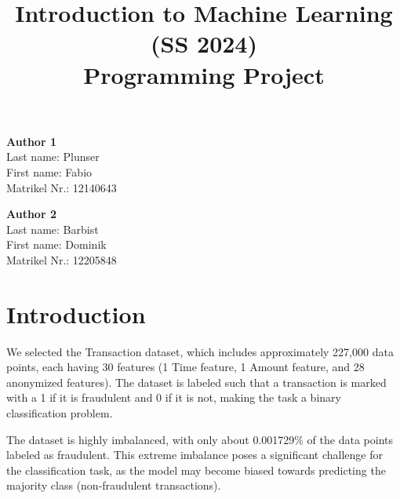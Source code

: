 \documentclass[a4, 10 pt, conference]{ieeeconf}  %
\title{\LARGE \bf
Introduction to Machine Learning (SS 2024)\\ Programming Project
\vspace{-3em}
}
\begin{document}
\maketitle
\vspace{-3em}
\thispagestyle{empty}
\pagestyle{empty}

\begin{strip}
  \begin{tcolorbox}[
      size=tight,
      colback=white,
      boxrule=0.2mm,
      left=3mm,right=3mm, top=3mm, bottom=1mm
    ]
    {\begin{multicols}{2}%

        \textbf{Author 1}       \\
        Last name: Plunser              \\  %
        First name: Fabio             \\  %
        Matrikel Nr.: 12140643               \\  %

        \columnbreak

        \textbf{Author 2}       \\
        Last name: Barbist              \\  %
        First name: Dominik             \\  %
        Matrikel Nr.: 12205848               \\  %

        \columnbreak

      \end{multicols}}
  \end{tcolorbox}
\end{strip}


\section{Introduction}
\label{sec:intro}
We selected the Transaction dataset, which includes approximately 227,000 data points, each having 30 features (1 Time feature, 1 Amount feature, and 28 anonymized features). The dataset is labeled such that a transaction is
marked with a 1 if it is fraudulent and 0 if it is not, making the task a binary classification problem.

The dataset is highly imbalanced, with only about 0.001729\% of the data points labeled as fraudulent. This extreme imbalance poses a significant challenge for the classification task, as the model may become
biased towards predicting the majority class (non-fraudulent transactions).
\end{document}
